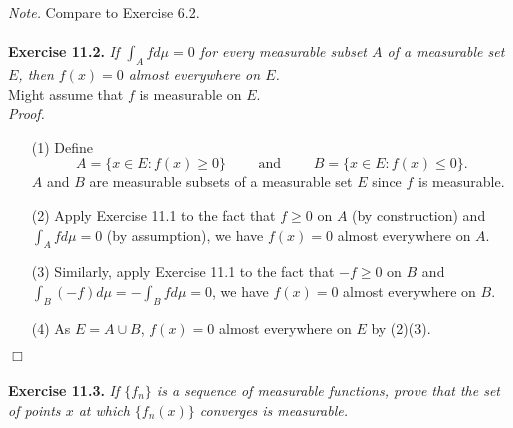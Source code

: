 \documentclass{article}
\begin{document}
\emph{Note.}
Compare to Exercise 6.2. \\\\






\textbf{Exercise 11.2.}
\emph{If $\int_A f d\mu = 0$ for every measurable subset $A$ of a measurable set $E$,
then $f(x) = 0$ almost everywhere on $E$.} \\

Might assume that $f$ is measurable on $E$. \\

\emph{Proof.}
\begin{enumerate}
\item[(1)]
  Define
  \[
    A = \{ x \in E : f(x) \geq 0 \}
    \qquad \text{ and } \qquad
    B = \{ x \in E : f(x) \leq 0 \}.
  \]
  $A$ and $B$ are measurable subsets of a measurable set $E$ since $f$ is measurable.

\item[(2)]
  Apply Exercise 11.1 to the fact that $f \geq 0$ on $A$ (by construction)
  and $\int_A f d\mu = 0$ (by assumption),
  we have $f(x) = 0$ almost everywhere on $A$.

\item[(3)]
  Similarly,
  apply Exercise 11.1 to the fact that $-f \geq 0$ on $B$
  and $\int_B (-f) d\mu = -\int_B f d\mu = 0$,
  we have $f(x) = 0$ almost everywhere on $B$.

\item[(4)]
  As $E = A \cup B$, $f(x) = 0$ almost everywhere on $E$ by (2)(3).
\end{enumerate}
$\Box$ \\\\






\textbf{Exercise 11.3.}
\emph{If $\{f_n\}$ is a sequence of measurable functions,
prove that the set of points $x$ at which $\{f_n(x)\}$ converges is measurable.} \\
\end{document}
